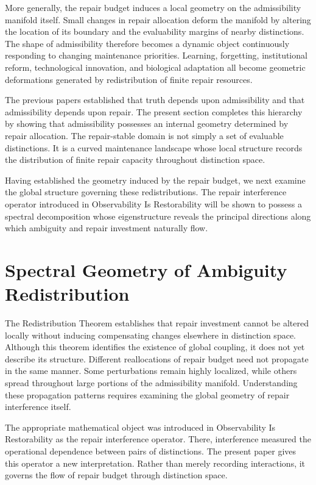 \documentclass[12pt,oneside]{article}
\theoremstyle{plain}
\theoremstyle{definition}
\theoremstyle{remark}
\begin{document}
More generally, the repair budget induces a local geometry on the admissibility manifold itself. Small changes in repair allocation deform the manifold by altering the location of its boundary and the evaluability margins of nearby distinctions. The shape of admissibility therefore becomes a dynamic object continuously responding to changing maintenance priorities. Learning, forgetting, institutional reform, technological innovation, and biological adaptation all become geometric deformations generated by redistribution of finite repair resources.

The previous papers established that truth depends upon admissibility and that admissibility depends upon repair. The present section completes this hierarchy by showing that admissibility possesses an internal geometry determined by repair allocation. The repair-stable domain is not simply a set of evaluable distinctions. It is a curved maintenance landscape whose local structure records the distribution of finite repair capacity throughout distinction space.

Having established the geometry induced by the repair budget, we next examine the global structure governing these redistributions. The repair interference operator introduced in Observability Is Restorability will be shown to possess a spectral decomposition whose eigenstructure reveals the principal directions along which ambiguity and repair investment naturally flow.

\section{Spectral Geometry of Ambiguity Redistribution} 

The Redistribution Theorem establishes that repair investment cannot be altered locally without inducing compensating changes elsewhere in distinction space. Although this theorem identifies the existence of global coupling, it does not yet describe its structure. Different reallocations of repair budget need not propagate in the same manner. Some perturbations remain highly localized, while others spread throughout large portions of the admissibility manifold. Understanding these propagation patterns requires examining the global geometry of repair interference itself.

The appropriate mathematical object was introduced in Observability Is Restorability as the repair interference operator. There, interference measured the operational dependence between pairs of distinctions. The present paper gives this operator a new interpretation. Rather than merely recording interactions, it governs the flow of repair budget through distinction space.
\end{document}

